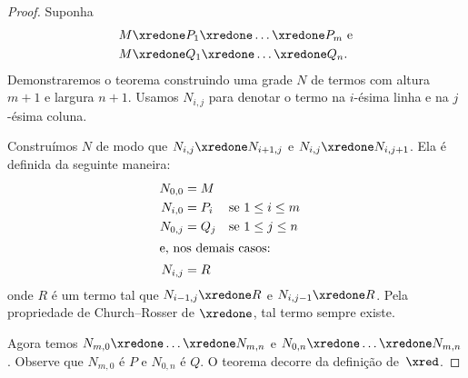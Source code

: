 \documentclass[../../../include/open-logic-section]{subfiles}
\begin{document}
\begin{proof}
  Suponha
  \begin{align*}
    M & \xredone P_1 \xredone \dots \xredone P_m \text{ e}\\
    M & \xredone Q_1 \xredone \dots \xredone Q_n.
  \end{align*}
  Demonstraremos o teorema construindo uma grade $N$ de termos com altura
  $m + 1$ e largura $n + 1$. Usamos $N_{i,j}$ para denotar o termo na
  $i$-ésima linha e na $j$-ésima coluna.
  
  Construímos $N$ de modo que $N_{i,j} \xredone N_{i+1,j}$ e
  $N_{i,j} \xredone N_{i,j+1}$. Ela é definida da seguinte maneira:
  \begin{align*}
    N_{0,0} &= M \\
    N_{i,0} &= P_i && \text{se } 1 \le i \le m \\
    N_{0,j} &= Q_j && \text{se } 1 \le j \le n \\
  \intertext{e, nos demais casos:}
    N_{i,j} &= R
  \end{align*}
  onde $R$ é um termo tal que $N_{i-1,j} \xredone R$ e $N_{i,j-1}
  \xredone R$. Pela propriedade de Church--Rosser de $\xredone$, tal termo
  sempre existe.

  Agora temos $N_{m,0} \xredone \dots \xredone N_{m,n}$ e $N_{0,n}
  \xredone \dots \xredone N_{m,n}$. Observe que $N_{m,0}$ é $P$ e $N_{0,n}$
  é $Q$. O teorema decorre da definição de~$\xred$.
\end{proof}
\end{document}

